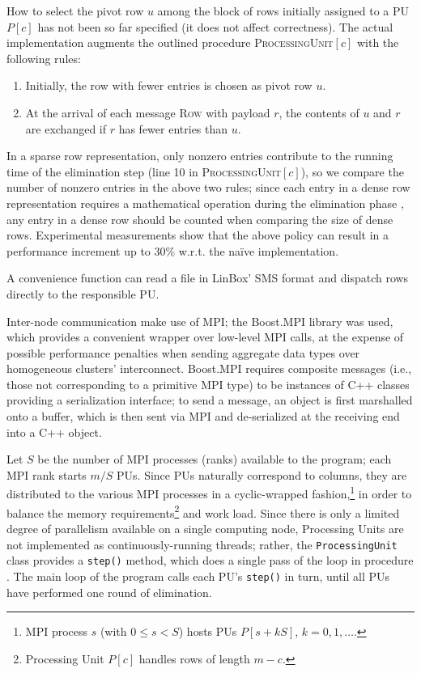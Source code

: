 How to select the pivot row $u$ among the block of rows initially
assigned to a PU $P[c]$ has not been so far specified (it does not
affect correctness).  The actual implementation augments the outlined
procedure \textsc{ProcessingUnit}$[c]$ with the following rules:
\begin{enumerate}
\item Initially, the row with fewer entries is chosen as pivot
  row $u$.
\item At the arrival of each message \textsc{Row} with payload $r$,
  the contents of $u$ and $r$ are exchanged if $r$ has fewer
  entries than $u$.
\end{enumerate}
In a sparse row representation, only nonzero entries contribute to the
running time of the elimination step (line 10 in
\textsc{ProcessingUnit}$[c]$), so we compare the number of nonzero
entries in the above two rules; since each entry in a dense row
representation requires a mathematical operation during the
elimination phase , any entry in a dense row should be counted when
comparing the size of dense rows.  Experimental measurements show that
the above policy can result in a performance increment up to 30\%
w.r.t. the naïve implementation.

A convenience function can read a file in LinBox' SMS format and dispatch rows directly to the
responsible PU.

Inter-node communication make use of MPI; the Boost.MPI library was used, which provides a convenient wrapper
over low-level MPI calls, at the expense of possible performance
penalties when sending aggregate data types over homogeneous clusters'
interconnect.  Boost.MPI requires composite messages (i.e., those not
corresponding to a primitive MPI type) to be instances of C++ classes
providing a serialization interface; to send a message, an object is
first marshalled onto a buffer, which is then sent via MPI and de-serialized
at the receiving end into a C++ object.  

Let $S$ be the number of MPI processes (ranks) available to the
program; each MPI rank starts $m/S$ PUs.  Since PUs naturally
correspond to columns, they are distributed to the various MPI
processes in a cyclic-wrapped fashion,\footnote{MPI process $s$ (with
  $0 \leq s < S$) hosts PUs $P[s + kS]$, $k=0,1,\ldots$.} in order to
balance the memory requirements\footnote{Processing Unit $P[c]$
  handles rows of length $m-c$.} and work load.  Since there is only a
limited degree of parallelism available on a single computing node,
Processing Units are not implemented as continuously-running threads;
rather, the \verb"ProcessingUnit" class provides a \verb"step()"
method, which does a single pass of the loop in procedure
.  The main loop of the program calls each PU's
\verb"step()" in turn, until all PUs have performed one round of
elimination. 

